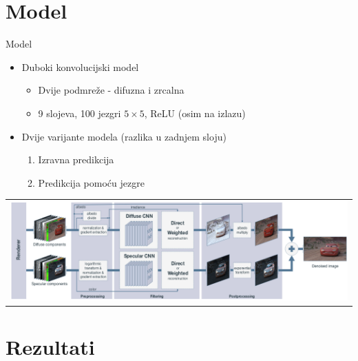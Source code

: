 \documentclass[12pt]{beamer}
\begin{document}
  \section{Model}
  \begin{frame}{Model}
    \begin{itemize}
    \item Duboki konvolucijski model
      \begin{itemize}
        \item Dvije podmreže - difuzna i zrcalna
      \item 9 slojeva, 100 jezgri $5 \times 5$, ReLU (osim na izlazu)
      \end{itemize}
      \item Dvije varijante modela (razlika u zadnjem sloju)
    \begin{enumerate}
    \item Izravna predikcija
    \item Predikcija pomoću jezgre
    \end{enumerate}
    \end{itemize}

    \begin{center}
    \begin{tabular}{c}
      \includegraphics[width=\textwidth]{architecture.png}
    \end{tabular}
    \end{center}
  \end{frame}

  \section{Rezultati}
\end{document}
